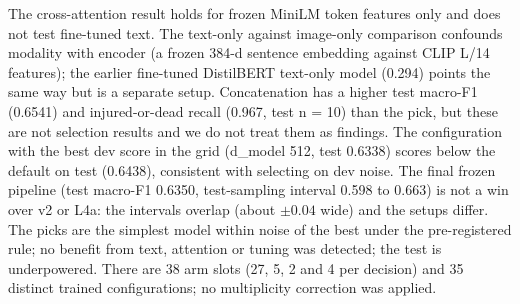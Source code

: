 The cross-attention result holds for frozen MiniLM token features only and does not test fine-tuned text.
The text-only against image-only comparison confounds modality with encoder (a frozen 384-d sentence embedding against CLIP L/14 features); the earlier fine-tuned DistilBERT text-only model (0.294) points the same way but is a separate setup.
Concatenation has a higher test macro-F1 (0.6541) and injured-or-dead recall (0.967, test n = 10) than the pick, but these are not selection results and we do not treat them as findings.
The configuration with the best dev score in the grid (d_model 512, test 0.6338) scores below the default on test (0.6438), consistent with selecting on dev noise.
The final frozen pipeline (test macro-F1 0.6350, test-sampling interval 0.598 to 0.663) is not a win over v2 or L4a: the intervals overlap (about $\pm 0.04$ wide) and the setups differ.
The picks are the simplest model within noise of the best under the pre-registered rule; no benefit from text, attention or tuning was detected; the test is underpowered.
There are 38 arm slots (27, 5, 2 and 4 per decision) and 35 distinct trained configurations; no multiplicity correction was applied.
